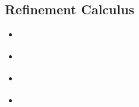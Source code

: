\subsection{Refinement Calculus}

\begin{itemize}
  \item {} \cite{irefinement_calc}
  \item {} \cite{back2012refinement}
  \item {} \cite{refinement_types_ml}
  \item {} \cite{morgan1990programming}
\end{itemize}
